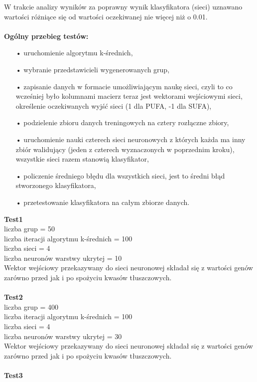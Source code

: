 \documentclass{classrep}
\begin{document}
W trakcie analizy wyników za poprawny wynik klasyfikatora (sieci) uznawano wartości różniące się od wartości oczekiwanej nie więcej niż o 0.01.\\\\
\textbf{Ogólny przebieg testów:}
\begin{itemize}
\item[•] uruchomienie algorytmu k-średnich,
\item[•] wybranie przedstawicieli wygenerowanych grup,
\item[•] zapisanie danych w formacie umożliwiającym naukę sieci, czyli to co wcześniej było kolumnami macierz teraz jest wektorami wejściowymi sieci, określenie oczekiwanych wyjść sieci (1 dla PUFA, -1 dla SUFA),
\item[•] podzielenie zbioru danych treningowych na cztery rozłączne zbiory,
\item[•] uruchomienie nauki czterech sieci neuronowych z których każda ma inny zbiór walidujący (jeden z czterech wyznaczonych w poprzednim kroku), wszystkie sieci razem stanowią klasyfikator,
\item[•] policzenie średniego błędu dla wszystkich sieci, jest to średni błąd stworzonego klasyfikatora,
\item[•] przetestowanie klasyfikatora na całym zbiorze danych.\\
\end{itemize}
\textbf{Test1}\\
liczba grup = 50\\
liczba iteracji algorytmu k-średnich = 100\\
liczba sieci = 4\\
liczba neuronów warstwy ukrytej = 10\\
Wektor wejściowy przekazywany do sieci neuronowej składał się z wartości genów zarówno przed jak i po spożyciu kwasów tłuszczowych.\\\\
\textbf{Test2}\\
liczba grup = 400\\
liczba iteracji algorytmu k-średnich = 100\\
liczba sieci = 4\\
liczba neuronów warstwy ukrytej = 30\\
Wektor wejściowy przekazywany do sieci neuronowej składał się z wartości genów zarówno przed jak i po spożyciu kwasów tłuszczowych.\\\\
\textbf{Test3}\\
\end{document}
